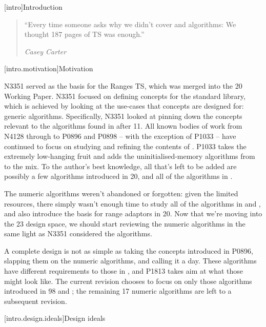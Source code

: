 [intro]{Introduction}

\begin{quote}
``Every time someone asks why we didn’t cover  and  algorithms: We
thought 187 pages of TS was enough.''
\begin{flushright}
\textemdash \textit{Casey Carter}
\end{flushright}
\end{quote}

[intro.motivation]{Motivation}

N3351\cite{N3351} served as the basis for the Ranges TS\cite{N4685}, which was merged into the
\Cpp{}20 Working Paper\cite{P0898}\cite{P0896}. N3351 focused on defining concepts for the standard
library, which is achieved by looking at the use-cases that concepts are designed for: generic
algorithms. Specifically, N3351 looked at pinning down the concepts relevant to the algorithms found
in  after \Cpp{}11. All known bodies of work from N4128\cite{N4128} through to
P0896 and P0898 -- with the exception of P1033\cite{P1033} -- have continued to focus on studying
and refining the contents of . P1033 takes the extremely low-hanging fruit and
adds the uninitialised-memory algorithms from  to the mix. To the author's best
knowledge, all that's left to be added are possibly a few algorithms introduced in \Cpp{}20, and all
of the algorithms in .

The numeric algorithms weren't abandoned or forgotten: given the limited resources, there simply
wasn't enough time to study all of the algorithms in  and , and
also introduce the basis for range adaptors in \Cpp{}20. Now that we're moving into the \Cpp{}23
design space, we should start reviewing the numeric algorithms in the same light as N3351 considered
the  algorithms.

A complete design is not as simple as taking the concepts introduced in P0896, slapping them on the
numeric algorithms, and calling it a day. These algorithms have different requirements to those in
, and P1813 takes aim at what those might look like. The current revision chooses
to focus on only those algorithms introduced in \Cpp{}98 and ; the remaining \Cpp{}17
numeric algorithms are left to a subsequent revision.

[intro.design.ideals]{Design ideals}

